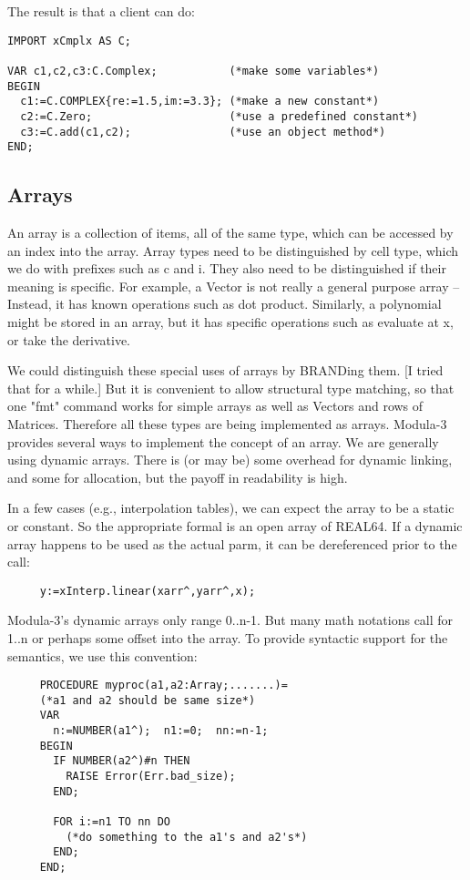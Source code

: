 The result is that a client can do:
\begin{tt} \begin{verbatim}
IMPORT xCmplx AS C;

VAR c1,c2,c3:C.Complex;           (*make some variables*)
BEGIN
  c1:=C.COMPLEX{re:=1.5,im:=3.3}; (*make a new constant*)
  c2:=C.Zero;                     (*use a predefined constant*)
  c3:=C.add(c1,c2);               (*use an object method*)
END;
\end{verbatim} \end{tt}

\subsection{Arrays}
An array is a collection of items, all of the same type,
which can be accessed by an index into the array.  Array
types need to be distinguished by cell type, which we do
with prefixes such as c and i.  They also need to be
distinguished if their meaning is specific.  For example, a
Vector is not really a general purpose array -- Instead, it
has known operations such as dot product.  Similarly, a
polynomial might be stored in an array, but it has specific
operations such as evaluate at x, or take the derivative.

We could distinguish these special uses of arrays by
BRANDing them.  [I tried that for a while.]  But it is
convenient to allow structural type matching, so that one
"fmt" command works for simple arrays as well as Vectors and
rows of Matrices.  Therefore all these types are being
implemented as arrays.  Modula-3 provides several ways to
implement the concept of an array.  We are generally using
dynamic arrays.  There is (or may be) some overhead for
dynamic linking, and some for allocation, but the payoff in
readability is high.

In a few cases (e.g., interpolation tables), we can expect
the array to be a static or constant.  So the appropriate
formal is an open array of REAL64.  If a dynamic array
happens to be used as the actual parm, it can be
dereferenced prior to the call:

\begin{tt} \begin{verbatim}
     y:=xInterp.linear(xarr^,yarr^,x);
\end{verbatim} \end{tt}

Modula-3's dynamic arrays only range 0..n-1.  But many math
notations call for 1..n or perhaps some offset into the
array.  To provide syntactic support for the semantics, we
use this convention:
\begin{tt} \begin{verbatim}
     PROCEDURE myproc(a1,a2:Array;.......)=
     (*a1 and a2 should be same size*)
     VAR
       n:=NUMBER(a1^);  n1:=0;  nn:=n-1;
     BEGIN
       IF NUMBER(a2^)#n THEN
         RAISE Error(Err.bad_size);
       END;
     
       FOR i:=n1 TO nn DO
         (*do something to the a1's and a2's*)
       END;
     END;
\end{verbatim} \end{tt}

